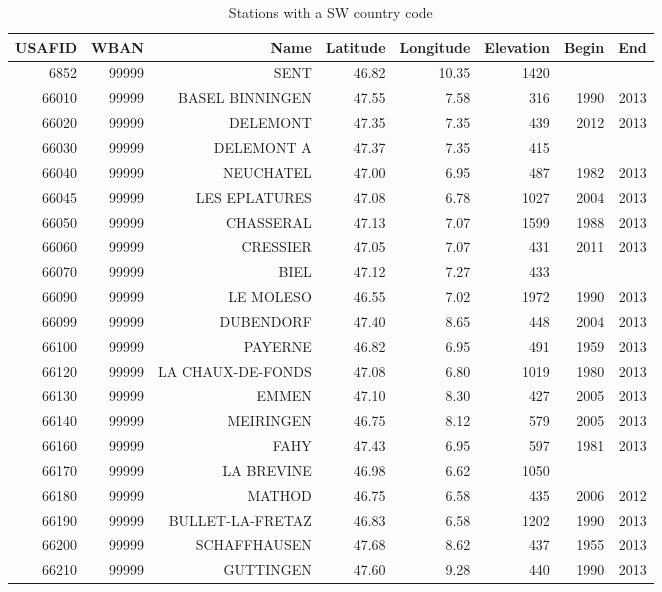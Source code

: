 \begin{longtable}{rrrrrrrr}
\caption{Stations with a SW country code} \\ 
  \toprule
USAFID & WBAN & Name & Latitude & Longitude & Elevation & Begin & End \\ 
  \midrule
6852 & 99999 & SENT & 46.82 & 10.35 & 1420 &  &  \\ 
  66010 & 99999 & BASEL BINNINGEN & 47.55 & 7.58 & 316 & 1990 & 2013 \\ 
  66020 & 99999 & DELEMONT & 47.35 & 7.35 & 439 & 2012 & 2013 \\ 
  66030 & 99999 & DELEMONT A & 47.37 & 7.35 & 415 &  &  \\ 
  66040 & 99999 & NEUCHATEL & 47.00 & 6.95 & 487 & 1982 & 2013 \\ 
  66045 & 99999 & LES EPLATURES & 47.08 & 6.78 & 1027 & 2004 & 2013 \\ 
  66050 & 99999 & CHASSERAL & 47.13 & 7.07 & 1599 & 1988 & 2013 \\ 
  66060 & 99999 & CRESSIER & 47.05 & 7.07 & 431 & 2011 & 2013 \\ 
  66070 & 99999 & BIEL & 47.12 & 7.27 & 433 &  &  \\ 
  66090 & 99999 & LE MOLESO & 46.55 & 7.02 & 1972 & 1990 & 2013 \\ 
  66099 & 99999 & DUBENDORF & 47.40 & 8.65 & 448 & 2004 & 2013 \\ 
  66100 & 99999 & PAYERNE & 46.82 & 6.95 & 491 & 1959 & 2013 \\ 
  66120 & 99999 & LA CHAUX-DE-FONDS & 47.08 & 6.80 & 1019 & 1980 & 2013 \\ 
  66130 & 99999 & EMMEN & 47.10 & 8.30 & 427 & 2005 & 2013 \\ 
  66140 & 99999 & MEIRINGEN & 46.75 & 8.12 & 579 & 2005 & 2013 \\ 
  66160 & 99999 & FAHY & 47.43 & 6.95 & 597 & 1981 & 2013 \\ 
  66170 & 99999 & LA BREVINE & 46.98 & 6.62 & 1050 &  &  \\ 
  66180 & 99999 & MATHOD & 46.75 & 6.58 & 435 & 2006 & 2012 \\ 
  66190 & 99999 & BULLET-LA-FRETAZ & 46.83 & 6.58 & 1202 & 1990 & 2013 \\ 
  66200 & 99999 & SCHAFFHAUSEN & 47.68 & 8.62 & 437 & 1955 & 2013 \\ 
  66210 & 99999 & GUTTINGEN & 47.60 & 9.28 & 440 & 1990 & 2013 \\ 

\end{longtable}

